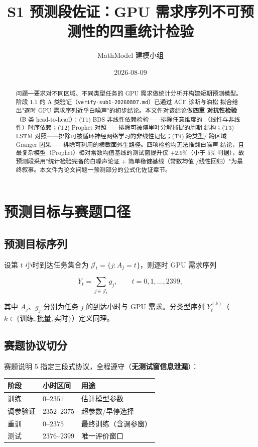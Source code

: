 \documentclass{internal-report}
\title{S1 预测段佐证：GPU 需求序列不可预测性的四重统计检验}
\author{MathModel 建模小组}
\date{2026-08-09}
\begin{document}
\maketitle

\begin{abstract}
问题一要求对不同区域、不同类型任务的 GPU 需求做统计分析并构建短期预测模型。
阶段 1.1 的 A 类验证（\texttt{verify-sub1-20260807.md}）已通过 ACF 诊断与泊松
拟合给出"逐时 GPU 需求序列近乎白噪声"的初步结论。本文件对该结论做\textbf{四重
对抗性检验}（B 类 head-to-head）：(T1) BDS 非线性依赖检验——排除任意维度的
（线性与非线性）时序依赖；(T2) Prophet 对照——排除可被傅里叶分解捕捉的周期
结构；(T3) LSTM 对照——排除可被循环神经网络学习的非线性记忆；(T4) 跨类型/
跨区域 Granger 因果——排除可利用的横截面外生路径。四项检验均无法推翻白噪声
结论，且最复杂模型（Prophet）相对常数均值基线的测试窗提升仅 $+2.9\%$（小于
$5\%$ 判据），故预测段采用"统计检验完备的白噪声论证 + 简单稳健基线（常数均值
/线性回归）"为最终叙事。本文件为论文问题一预测部分的公式化佐证章节。
\end{abstract}

\section{预测目标与赛题口径}

\subsection{预测目标序列}

设第 $t$ 小时到达任务集合为 $\mathcal{J}_t=\{j: A_j=t\}$，则逐时 GPU 需求序列

\begin{equation}
  Y_t = \sum_{j \in \mathcal{J}_t} g_j,\qquad t=0,1,\ldots,2399,
  \label{eq:yseq}
\end{equation}

其中 $A_j$、$g_j$ 分别为任务 $j$ 的到达小时与 GPU 需求。分类型序列
$Y_t^{(k)}$（$k\in\{\text{训练},\text{批量},\text{实时}\}$）定义同理。

\subsection{赛题协议切分}

赛题说明 5 指定三段式协议，全程遵守（\textbf{无测试窗信息泄漏}）：

\begin{center}
\begin{tabular}{lll}
\toprule
阶段 & 小时区间 & 用途 \\
\midrule
训练 & $0$--$2351$ & 估计模型参数 \\
调参验证 & $2352$--$2375$ & 超参数/早停选择 \\
重训 & $0$--$2375$ & 最终训练（含调参窗） \\
测试 & $2376$--$2399$ & 唯一评价窗口 \\
\bottomrule
\end{tabular}
\end{center}
\end{document}
